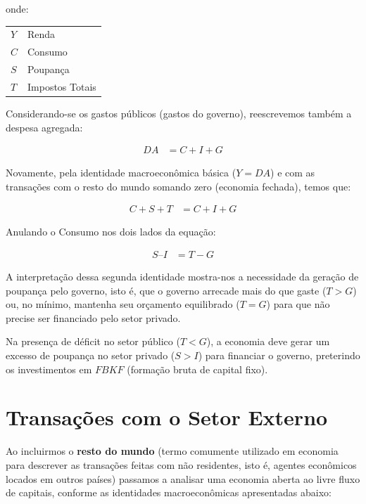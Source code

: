 \documentclass{article}\usepackage[]{graphicx}\usepackage[]{xcolor}
\makeatletter
\newenvironment{conditions}
  {\par\vspace{\abovedisplayskip}\noindent\begin{tabular}{>{$}l<{$} @{${}={}$} l}}
  {\end{tabular}\par\vspace{\belowdisplayskip}}
\makeatother
\begin{document}
onde:

\begin{conditions}
Y   &   Renda\\
C   &   Consumo\\
S   &   Poupança\\
T   &   Impostos Totais
\end{conditions}

Considerando-se os gastos públicos (gastos do governo), reescrevemos também a despesa agregada:

\begin{equation}\label{eq11}
\begin{split}
    DA   &=    C + I + G
\end{split}
\end{equation}

Novamente, pela identidade macroeconômica básica (\(Y = DA\)) e com as transações com o resto do mundo
somando zero (economia fechada), temos que:

\begin{equation}\label{eq12}
\begin{split}
    C + S + T   &=    C + I + G
\end{split}
\end{equation}

Anulando o Consumo nos dois lados da equação:

\begin{equation}\label{eq13}
\begin{split}
    S – I   &=    T - G
\end{split}
\end{equation}

A interpretação dessa segunda identidade mostra-nos a necessidade da geração de poupança pelo governo,
isto é, que o governo arrecade mais do que gaste (\(T > G\)) ou, no mínimo, mantenha seu orçamento equilibrado
(\(T = G\)) para que não precise ser financiado pelo setor privado.\par

Na presença de déficit no setor público (\(T < G\)), a economia deve gerar um excesso de poupança no setor privado
(\(S > I\)) para financiar o governo, preterindo os investimentos em \(FBKF\) (formação bruta de capital fixo).

\section*{Transações com o Setor Externo}

Ao incluirmos o \textbf{resto do mundo} (termo comumente utilizado em economia para descrever as transações feitas
com não residentes, isto é, agentes econômicos locados em outros países) passamos a analisar uma economia
aberta ao livre fluxo de capitais, conforme as identidades macroeconômicas apresentadas abaixo:
\end{document}
